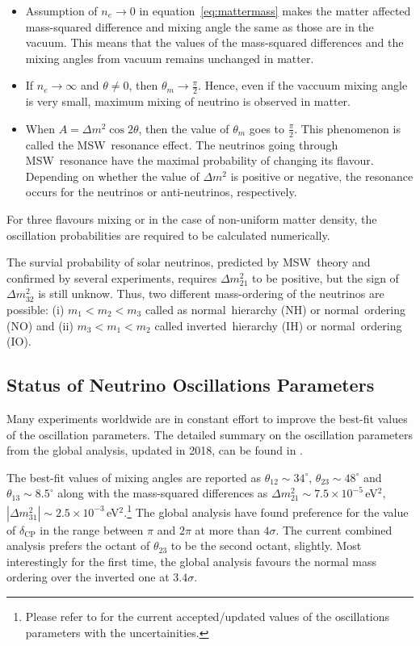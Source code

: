 \begin{itemize}\itemsep -4pt
\item Assumption of $n_{e}\rightarrow 0$ in equation~\ref{eq:mattermass} makes the matter affected mass-squared difference and mixing angle the same as those are in the vacuum. This means that the values of the mass-squared differences and the mixing angles from vacuum remains unchanged in matter.
\item If $n_{e}\rightarrow\infty$ and $\theta\neq 0$, then $\theta_{m}\rightarrow\frac{\pi}{2}$. Hence, even if the vaccuum mixing angle is very small, maximum mixing of neutrino is observed in matter.
\item When $A = \Delta m^{2}\cos 2\theta$, then the value of $\theta_{m}$ goes to $\frac{\pi}{2}$. This phenomenon is called the MSW~resonance effect. The neutrinos going through MSW~resonance have the maximal probability of changing its flavour. Depending on whether the value of $\Delta m^{2}$ is positive or negative, the resonance occurs for the neutrinos or anti-neutrinos, respectively.
\end{itemize}
For three flavours mixing or in the case of non-uniform matter density, the oscillation probabilities are required to be calculated numerically.

The survial probability of solar neutrinos, predicted by MSW~theory and confirmed by several experiments\cite{homestake,gallex,sage,superk,sno,kamland}, requires $\Delta m_{21}^{2}$ to be positive, but the sign of $\Delta m_{32}^{2}$ is still unknow. Thus, two different mass-ordering of the neutrinos are possible: (i) $m_{1}<m_{2}<m_{3}$ called as normal~hierarchy (NH) or normal~ordering (NO) and (ii) $m_{3}<m_{1}<m_{2}$ called inverted~hierarchy (IH) or normal~ordering (IO).


\subsection{Status of Neutrino Oscillations Parameters}
Many experiments worldwide are in constant effort to improve the best-fit values of the oscillation parameters. The detailed summary on the oscillation parameters from the global analysis, updated in 2018, can be found in \cite{neutrinostatus}.

The best-fit values of mixing angles are reported as $\theta_{12}\sim 34^{\circ}$, $\theta_{23}\sim 48^{\circ}$ and $\theta_{13}\sim 8.5^{\circ}$ along with the mass-squared differences as $\Delta m^2_{21}\sim 7.5\times 10^{-5}$\,eV$^{2}$, $\left|\Delta m^2_{31}\right|\sim 2.5\times 10^{-3}$\,eV$^{2}$.\footnote{Please refer to \cite{neutrinostatus} for the current accepted/updated values of the oscillations parameters with the uncertainities.} The global analysis have found preference for the value of $\delta_{\mathrm{CP}}$ in the range between $\pi$ and $2\pi$ at more than $4\sigma$. The current combined analysis prefers the octant of $\theta_{23}$ to be the second octant, slightly. Most interestingly for the first time, the global analysis favours the normal mass ordering over the inverted one at $3.4\sigma$.

